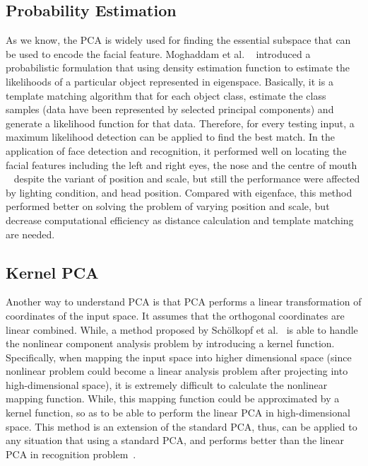 \documentclass[12pt, a4paper, twoside]{article}
\begin{document}
\subsection{Probability Estimation}
As we know, the PCA is widely used for finding the essential subspace that can be used to encode the facial feature. Moghaddam et al. ~\cite{598227} introduced a probabilistic formulation that using density estimation function to estimate the likelihoods of a particular object represented in eigenspace. Basically, it is a template matching algorithm that for each object class, estimate the class samples (data have been represented by selected principal components) and generate a likelihood function for that data. Therefore, for every testing input, a maximum likelihood detection can be applied to find the best match. In the application of face detection and recognition, it performed well on locating the facial features including the left and right eyes, the nose and the centre of mouth ~\cite{598227} despite the variant of position and scale, but still the performance were affected by lighting condition, and head position. Compared with eigenface, this method performed better on solving the problem of varying position and scale, but decrease computational efficiency as distance calculation and template matching are needed.

\subsection{Kernel PCA}
Another way to understand PCA is that PCA performs a linear transformation of coordinates of the input space. It assumes that the orthogonal coordinates are linear combined. While, a method proposed by Sch{\"o}lkopf et al.~\cite{scholkopf1998nonlinear} is able to handle the nonlinear component analysis problem by introducing a kernel function. Specifically, when mapping the input space into higher dimensional space (since nonlinear problem could become a linear analysis problem after projecting into high-dimensional space), it is extremely difficult to calculate the nonlinear mapping function. While, this mapping function could be approximated by a kernel function, so as to be able to perform the linear PCA in high-dimensional space. This method is an extension of the standard PCA, thus, can be applied to any situation that using a standard PCA, and performs better than the linear PCA in recognition problem~\cite{scholkopf1998nonlinear}.
\end{document}
